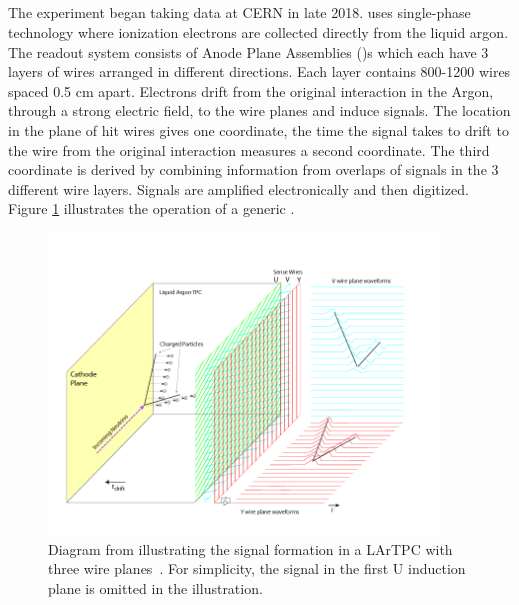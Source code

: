 \subsection{}
The  experiment began taking data at CERN in late 2018.   uses single-phase technology where ionization electrons are collected directly from the liquid argon. The readout system consists of  Anode Plane Assemblies ()s which each have 3 layers of wires arranged in different directions. Each layer contains 800-1200  wires spaced 0.5 cm apart. Electrons drift from the original interaction in the Argon, through a strong electric field, to the wire planes and induce signals.  The location in the plane of hit wires gives one coordinate, the time the signal takes to drift to the wire from the original interaction measures a second coordinate.  The third coordinate is derived by combining information from overlaps of signals in the 3 different wire layers.  Signals are amplified electronically and then digitized.  Figure \ref{tpcconcept} illustrates the operation of a generic .

\begin{figure}[h]
    \centering
\includegraphics[trim={0cm 0.6cm 2.5cm 0.7cm},clip,height=8cm]{graphics/IntroFigures/Fig_04_LArTPC_Concept.png}%
    \caption{Diagram  from    illustrating the signal formation in a LArTPC with three wire planes~\cite{Acciarri:2016smi}. For simplicity, the signal in the first U induction plane is omitted in the illustration. }%
    \label{tpcconcept}
    \end{figure}

